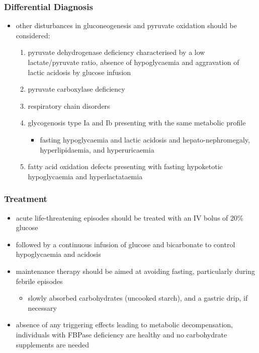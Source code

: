 \documentclass{scrartcl}
\begin{document}
\subsubsection{Differential Diagnosis}
\label{sec:org6e658bd}
\begin{itemize}
\item other disturbances in gluconeogenesis and pyruvate oxidation should be considered:
\begin{enumerate}
\item pyruvate dehydrogenase deficiency characterised by a low
lactate/pyruvate ratio, absence of hypoglycaemia and aggravation
of lactic acidosis by glucose infusion
\item pyruvate carboxylase deficiency
\item respiratory chain disorders
\item glycogenosis type Ia and Ib presenting with the same metabolic profile
\begin{itemize}
\item fasting hypoglycaemia and lactic acidosis and hepato-nephromegaly, hyperlipidaemia, and hyperuricaemia
\end{itemize}
\item fatty acid oxidation defects presenting with fasting hypoketotic hypoglycaemia and hyperlactataemia
\end{enumerate}
\end{itemize}

\subsubsection{Treatment}
\label{sec:orgb450aca}
\begin{itemize}
\item acute life-threatening episodes should be treated with an IV bolus
of 20\% glucose
\item followed by a continuous infusion of glucose and bicarbonate to
control hypoglycaemia and acidosis
\item maintenance therapy should be aimed at avoiding fasting,
particularly during febrile episodes
\begin{itemize}
\item slowly absorbed carbohydrates (uncooked starch), and a gastric
drip, if necessary
\end{itemize}
\item absence of any triggering effects leading to metabolic
decompensation, individuals with FBPase deficiency are healthy and
no carbohydrate supplements are needed
\end{itemize}
\end{document}
